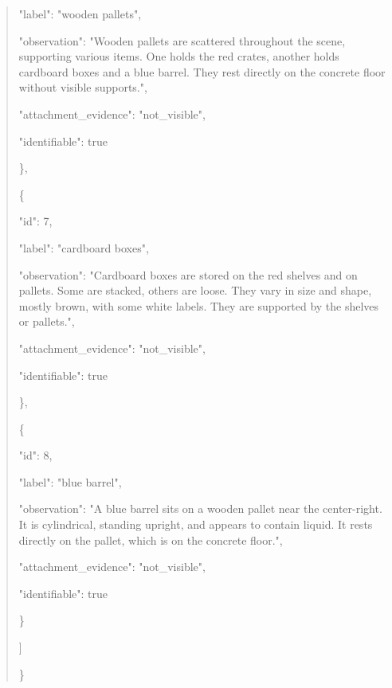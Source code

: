 \documentclass[10pt,a4paper]{article}
\begin{document}
\begin{quote}
      "label":\allowbreak{} "wooden pallets",\allowbreak{}\par
      "observation":\allowbreak{} "Wooden pallets are scattered throughout the scene,\allowbreak{} supporting various items. One holds the red crates,\allowbreak{} another holds cardboard boxes and a blue barrel. They rest directly on the concrete floor without visible supports.",\allowbreak{}\par
      "attachment\_evidence":\allowbreak{} "not\_visible",\allowbreak{}\par
      "identifiable":\allowbreak{} true\par
    \},\allowbreak{}\par
    \{\par
      "id":\allowbreak{} 7,\allowbreak{}\par
      "label":\allowbreak{} "cardboard boxes",\allowbreak{}\par
      "observation":\allowbreak{} "Cardboard boxes are stored on the red shelves and on pallets. Some are stacked,\allowbreak{} others are loose. They vary in size and shape,\allowbreak{} mostly brown,\allowbreak{} with some white labels. They are supported by the shelves or pallets.",\allowbreak{}\par
      "attachment\_evidence":\allowbreak{} "not\_visible",\allowbreak{}\par
      "identifiable":\allowbreak{} true\par
    \},\allowbreak{}\par
    \{\par
      "id":\allowbreak{} 8,\allowbreak{}\par
      "label":\allowbreak{} "blue barrel",\allowbreak{}\par
      "observation":\allowbreak{} "A blue barrel sits on a wooden pallet near the center-right. It is cylindrical,\allowbreak{} standing upright,\allowbreak{} and appears to contain liquid. It rests directly on the pallet,\allowbreak{} which is on the concrete floor.",\allowbreak{}\par
      "attachment\_evidence":\allowbreak{} "not\_visible",\allowbreak{}\par
      "identifiable":\allowbreak{} true\par
    \}\par
  ]\par
\}
\end{quote}
\end{document}
